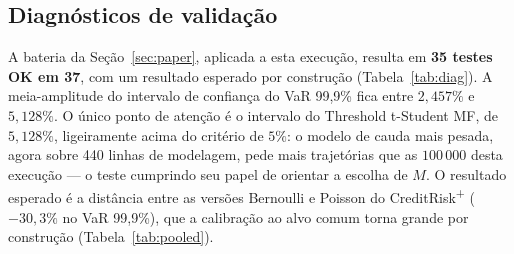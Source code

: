 \documentclass[11pt,a4paper]{article}
\begin{document}
\subsection{Diagnósticos de validação}

A bateria da Seção~\ref{sec:paper}, aplicada a esta execução, resulta em \textbf{35 testes OK em 37}, com um resultado esperado por construção (Tabela~\ref{tab:diag}). A meia-amplitude do intervalo de confiança do VaR 99{,}9\% fica entre $2{,}457\%$ e $5{,}128\%$. O único ponto de atenção é o intervalo do Threshold t-Student MF, de $5{,}128\%$, ligeiramente acima do critério de $5\%$: o modelo de cauda mais pesada, agora sobre 440 linhas de modelagem, pede mais trajetórias que as $100\,000$ desta execução --- o teste cumprindo seu papel de orientar a escolha de $M$. O resultado esperado é a distância entre as versões Bernoulli e Poisson do CreditRisk\textsuperscript{+} ($-30{,}3\%$ no VaR 99{,}9\%), que a calibração ao alvo comum torna grande por construção (Tabela~\ref{tab:pooled}).
\end{document}
